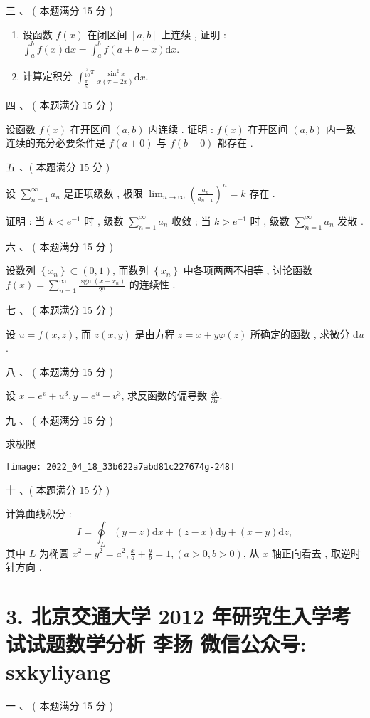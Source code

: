 \documentclass[10pt]{article}
\begin{document}
{ 三 、 ( 本题满分  15  分 )

\begin{enumerate}
  \item  设函数  $f(x)$  在闭区间  $[a, b]$  上连续 ,  证明 : $\int_{a}^{b} f(x) \mathrm{d} x=\int_{a}^{b} f(a+b-x) \mathrm{d} x$.

  \item  计算定积分  $\int_{\frac{\pi}{5}}^{\frac{3}{10} \pi} \frac{\sin ^{2} x}{x(\pi-2 x)} \mathrm{d} x$.

\end{enumerate}
 四 、 ( 本题满分  15  分 )

 设函数  $f(x)$  在开区间  $(a, b)$  内连续 .  证明 : $f(x)$  在开区间  $(a, b)$  内一致连续的充分必要条件是  $f(a+0)$  与  $f(b-0)$  都存在 .

 五 、( 本题满分  15  分 )

 设  $\sum_{n=1}^{\infty} a_{n}$  是正项级数 ,  极限  $\lim _{n \rightarrow \infty}\left(\frac{a_{n}}{a_{n-1}}\right)^{n}=k$  存在 .

 证明 :  当  $k<e^{-1}$  时 ,  级数  $\sum_{n=1}^{\infty} a_{n}$  收敛 ;  当  $k>e^{-1}$  时 ,  级数  $\sum_{n=1}^{\infty} a_{n}$  发散 .

 六 、 ( 本题满分  15  分 )

 设数列  $\left\{x_{n}\right\} \subset(0,1)$,  而数列  $\left\{x_{n}\right\}$  中各项两两不相等 ,  讨论函数  $f(x)=\sum_{n=1}^{\infty} \frac{\operatorname{sgn}\left(x-x_{n}\right)}{2^{n}}$  的连续性 .

 七 、 ( 本题满分  15  分 )

 设  $u=f(x, z)$,  而  $z(x, y)$  是由方程  $z=x+y \varphi(z)$  所确定的函数 ,  求微分  $\mathrm{d} u$.

 八 、 ( 本题满分  15  分 )

 设  $x=e^{v}+u^{3}, y=e^{u}-v^{3}$,  求反函数的偏导数  $\frac{\partial v}{\partial x}$.

 九 、 ( 本题满分  15  分 )

 求极限 

\texttt{[image: 2022\_04\_18\_33b622a7abd81c227674g-248]}

 十 、( 本题满分  15  分 )

 计算曲线积分 :
$$
I=\oint_{L}(y-z) \mathrm{d} x+(z-x) \mathrm{d} y+(x-y) \mathrm{d} z,
$$
 其中  $L$  为椭圆  $x^{2}+y^{2}=a^{2}, \frac{x}{a}+\frac{y}{b}=1,(a>0, b>0)$,  从  $x$  轴正向看去 ,  取逆时针方向 .

\section{3. 北京交通大学 2012 年研究生入学考试试题数学分析 
 李扬 
 微信公众号: sxkyliyang}
 一 、 ( 本题满分  15  分 )

}
\end{document}
